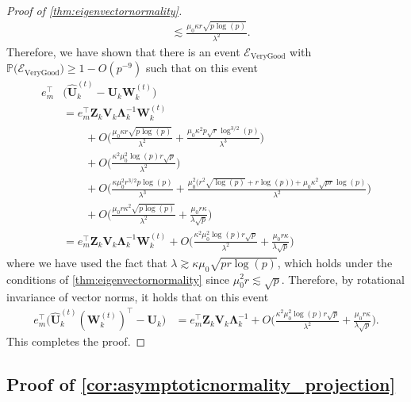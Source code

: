 \documentclass[10pt]{article}
\newcommand{\0}{{\mathbf{0}}}
\newcommand{\1}{{\mathbf{1}}}
\newcommand{\U}{{\mathbf{U}}}
\renewcommand{\t}{^{\top}}
\newcommand{\uhat}{\mathbf{\hat{U}}}
\newcommand{\p}{\mathbb{P}}
\newcommand{\inv}{^{-1}}
\renewcommand{\hat}{\widehat}
\renewcommand{\hat}{\widehat}
\begin{document}
\begin{proof}[Proof of \cref{thm:eigenvectornormality}]
\begin{align*}
   &\lesssim \frac{\mu_0 \kappa r \sqrt{p\log(p)} }{\lambda^2}.
\end{align*}
Therefore, we have shown that there is an event $\mathcal{E}_{\mathrm{Very Good}}$  with  $\p\big( \mathcal{E}_{\mathrm{Very Good}}\big) \geq 1 - O(p^{-9})$ such that on this event
\begin{align*}
    e_m\t &\bigg( \uhat_k^{(t)} - \U_k \mathbf{W}_k^{(t)} \bigg) \\
    &= e_m\t \mathbf{Z}_k \mathbf{V}_k \mathbf{\Lambda}_k\inv \mathbf{W}_k^{(t)} \\
    &\qquad + O\bigg( \frac{\mu_0 \kappa r \sqrt{p\log(p)} }{\lambda^2} + \frac{\mu_0 \kappa^2 p \sqrt{r} \log^{3/2}(p)  }{\lambda^3} \bigg) \\
    &\qquad + O\bigg( \frac{\kappa^2 \mu_0^2 \log(p) r \sqrt{p}}{\lambda^2} \bigg) \\
    &\qquad + O\bigg( \frac{\kappa \mu_0^2 r^{3/2}p \log(p)}{\lambda^3} + \frac{\mu_0^2 \big( r^2 \sqrt{\log(p)} + r \log(p)\big) + \mu_0 \kappa^2 \sqrt{pr} \log(p)}{\lambda^2} \bigg) \\ 
    &\qquad + O\bigg( \frac{\mu_0 r \kappa^2 \sqrt{p\log(p)}}{\lambda^2} + \frac{\mu_0 r \kappa}{\lambda \sqrt{p}} \bigg) \\
    &= e_m\t \mathbf{Z}_k \mathbf{V}_k \mathbf{\Lambda}_k\inv \mathbf{W}_k^{(t)} + O\bigg( \frac{\kappa^2 \mu_0^2 \log(p) r \sqrt{p}}{\lambda^2} + \frac{\mu_0 r \kappa}{\lambda \sqrt{p}} \bigg) 
\end{align*}
where we have used the fact that $\lambda \gtrsim \kappa \mu_0 \sqrt{pr \log(p)}$, which holds under the conditions of \cref{thm:eigenvectornormality} since $\mu_0^2 r \lesssim \sqrt{p}$. 
Therefore, by rotational invariance of vector norms, it holds that on this event
\begin{align*}
    e_m\t \bigg( \uhat_k^{(t)} (\mathbf{W}_k^{(t)})\t - \U_k \bigg) &= e_m\t \mathbf{Z}_k \mathbf{V}_k \mathbf{\Lambda}_k\inv + O\bigg( \frac{\kappa^2 \mu_0^2 \log(p) r \sqrt{p}}{\lambda^2} + \frac{\mu_0 r \kappa}{\lambda \sqrt{p}}  \bigg).
\end{align*}
This completes the proof.
\end{proof}
\subsection{Proof of \cref{cor:asymptoticnormality_projection}} \label{sec:corollaryprojectionproof}
\end{document}

